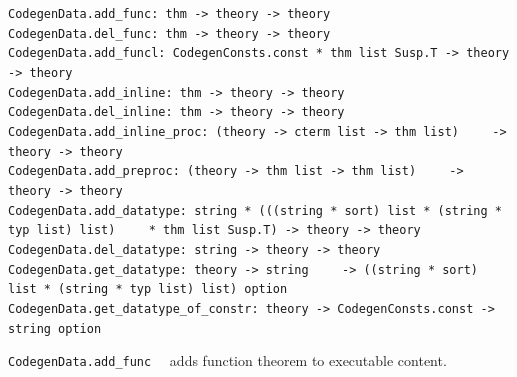 \begin{isabellebody}
\begin{isamarkuptext}
\begin{description}
  \end{description}%
\end{isamarkuptext}%
\isamarkuptrue%
%
\endisatagmlref
{\isafoldmlref}%
%
\isadelimmlref
%
\endisadelimmlref
%
\isamarkuptrue%
%
\isadelimmlref
%
\endisadelimmlref
%
\isatagmlref
%
\begin{isamarkuptext}%
\begin{mldecls}
  \verb|CodegenData.add_func: thm -> theory -> theory| \\
  \verb|CodegenData.del_func: thm -> theory -> theory| \\
  \verb|CodegenData.add_funcl: CodegenConsts.const * thm list Susp.T -> theory -> theory| \\
  \verb|CodegenData.add_inline: thm -> theory -> theory| \\
  \verb|CodegenData.del_inline: thm -> theory -> theory| \\
  \verb|CodegenData.add_inline_proc: (theory -> cterm list -> thm list)|\isasep\isanewline%
\verb|    -> theory -> theory| \\
  \verb|CodegenData.add_preproc: (theory -> thm list -> thm list)|\isasep\isanewline%
\verb|    -> theory -> theory| \\
  \verb|CodegenData.add_datatype: string * (((string * sort) list * (string * typ list) list)|\isasep\isanewline%
\verb|    * thm list Susp.T) -> theory -> theory| \\
  \verb|CodegenData.del_datatype: string -> theory -> theory| \\
  \verb|CodegenData.get_datatype: theory -> string|\isasep\isanewline%
\verb|    -> ((string * sort) list * (string * typ list) list) option| \\
  \verb|CodegenData.get_datatype_of_constr: theory -> CodegenConsts.const -> string option|
  \end{mldecls}

  \begin{description}

  \item \verb|CodegenData.add_func|~~ adds function
     theorem  to executable content.


\end{description}
\end{isamarkuptext}
\end{isabellebody}
